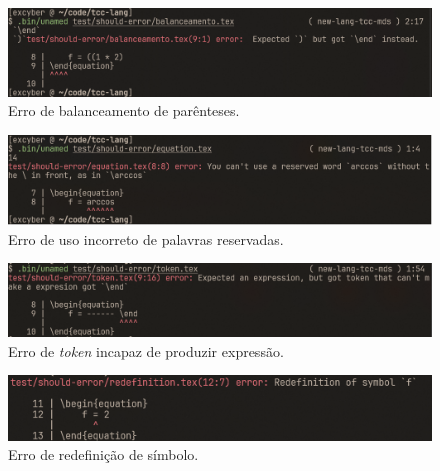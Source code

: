 \begin{figure}[H]
    \caption{\label{error-balanceamento} \small Erro de balanceamento de parênteses.}
    \begin{center}
        \includegraphics[scale=0.5]{./Imagens/error-balanceamento.png}
    \end{center}
\end{figure}

\begin{figure}[H]
    \caption{\label{error-reserved-word} \small Erro de uso incorreto de palavras reservadas.}
    \begin{center}
        \includegraphics[scale=0.5]{./Imagens/error-reserved-word.png}
    \end{center}
\end{figure}


\begin{figure}[H]
    \caption{\label{error-cant-make-expression} \small Erro de \textit{token} incapaz de produzir expressão.}
    \begin{center}
        \includegraphics[scale=0.5]{./Imagens/error-cant-make-expression.png}
    \end{center}
\end{figure}

\begin{figure}[H]
    \caption{\label{error-redefinition} \small Erro de redefinição de símbolo.}
    \begin{center}
        \includegraphics[scale=0.5]{./Imagens/error-redefinition.png}
    \end{center}
\end{figure}



